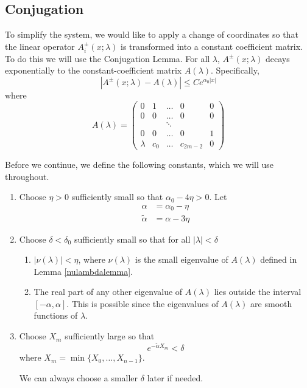 \documentclass[thesis.tex]{subfiles}
\begin{document}
\subsection{Conjugation}

To simplify the system, we would like to apply a change of coordinates so that the linear operator $A_i^\pm(x; \lambda)$ is transformed into a constant coefficient matrix. To do this we will use the Conjugation Lemma. For all $\lambda$, $A^\pm(x; \lambda)$ decays exponentially to the constant-coefficient matrix $A(\lambda)$. Specifically, 
\[
|A^\pm(x; \lambda) - A(\lambda)| \leq C e^{\alpha_0 |x|}
\]
where
\begin{equation}\label{Alambda}
A(\lambda) = \begin{pmatrix}
0 & 1 & \dots & 0 & 0 \\
0 & 0 & \dots & 0 & 0 \\
& & \ddots  \\
0 & 0 & \dots & 0 & 1 \\
\lambda & c_0 & \dots & c_{2m-2} & 0
\end{pmatrix}
\end{equation}

Before we continue, we define the following constants, which we will use throughout.
\begin{enumerate}
	\item Choose $\eta > 0$ sufficiently small so that $\alpha_0 - 4 \eta > 0$. Let
	\begin{align*}
	\alpha &= \alpha_0 - \eta \\
	\tilde{\alpha} &= \alpha - 3 \eta
	\end{align*}

	\item Choose $\delta < \delta_0$ sufficiently small so that for all $|\lambda| < \delta$
	\begin{enumerate}
		\item $|\nu(\lambda)| < \eta$, where $\nu(\lambda)$ is the small eigenvalue of $A(\lambda)$ defined in Lemma \ref{nulambdalemma}.
		\item The real part of any other eigenvalue of $A(\lambda)$ lies outside the interval $[-\alpha, \alpha]$. This is possible since the eigenvalues of $A(\lambda)$ are smooth functions of $\lambda$.
	\end{enumerate}

	\item Choose $X_m$ sufficiently large so that
	\begin{equation}
	e^{-\tilde{\alpha} X_m} < \delta
	\end{equation}
	where $X_m = \min\{X_0, \dots, X_{n-1}\}$.

	We can always choose a smaller $\delta$ later if needed.
\end{enumerate}
\end{document}
